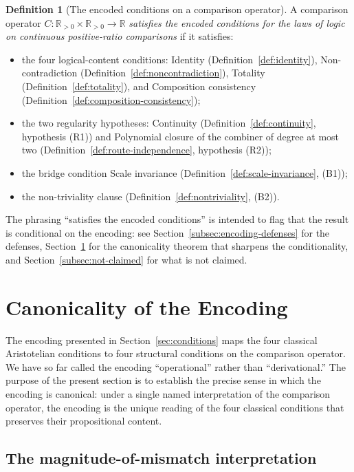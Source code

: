 \documentclass[11pt,a4paper]{article}
\theoremstyle{definition}
\newtheorem{definition}[theorem]{Definition}
\theoremstyle{remark}
\begin{document}
\begin{definition}[The encoded conditions on a comparison operator]
\label{def:laws-of-logic}
A comparison operator $C: \mathbb{R}_{>0} \times \mathbb{R}_{>0} \to
\mathbb{R}$ \emph{satisfies the encoded conditions for the laws of logic
on continuous positive-ratio comparisons} if it satisfies:
\begin{itemize}[leftmargin=*]
\item the four logical-content conditions: Identity
(Definition~\ref{def:identity}), Non-contradiction
(Definition~\ref{def:noncontradiction}), Totality
(Definition~\ref{def:totality}), and Composition consistency
(Definition~\ref{def:composition-consistency});
\item the two regularity hypotheses: Continuity
(Definition~\ref{def:continuity}, hypothesis (R1)) and Polynomial
closure of the combiner of degree at most two
(Definition~\ref{def:route-independence}, hypothesis (R2));
\item the bridge condition Scale invariance
(Definition~\ref{def:scale-invariance}, (B1));
\item the non-triviality clause
(Definition~\ref{def:nontriviality}, (B2)).
\end{itemize}
The phrasing ``satisfies the encoded conditions'' is intended to flag
that the result is conditional on the encoding: see
Section~\ref{subsec:encoding-defenses} for the defenses,
Section~\ref{sec:canonicality} for the canonicality theorem that
sharpens the conditionality, and Section~\ref{subsec:not-claimed} for
what is not claimed.
\end{definition}

\section{Canonicality of the Encoding}\label{sec:canonicality}

The encoding presented in Section~\ref{sec:conditions} maps the four
classical Aristotelian conditions to four structural conditions on the
comparison operator. We have so far called the encoding
``operational'' rather than ``derivational.'' The purpose of the
present section is to establish the precise sense in which the
encoding is canonical: under a single named interpretation of the
comparison operator, the encoding is the unique reading of the four
classical conditions that preserves their propositional content.

\subsection{The magnitude-of-mismatch interpretation}
\end{document}
